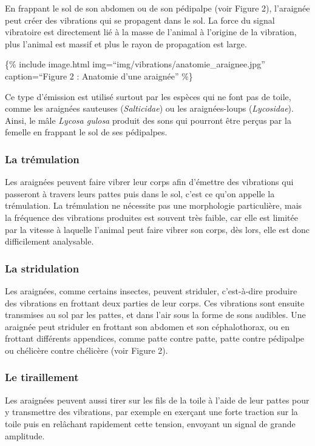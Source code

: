 En frappant le sol de son abdomen ou de son pédipalpe (voir Figure 2),
l'araignée peut créer des vibrations qui se propagent dans le sol. La
force du signal vibratoire est directement lié à la masse de l'animal à
l'origine de la vibration, plus l'animal est massif et plus le rayon de
propagation est large.

\{\% include image.html img=``img/vibrations/anatomie\_araignee.jpg''
caption=``Figure 2 : Anatomie d'une araignée'' \%\}

Ce type d'émission est utilisé surtout par les espèces qui ne font pas
de toile, comme les araignées sauteuses (\emph{Salticidae}) ou les
araignées-loups (\emph{Lycosidae}). Ainsi, le mâle \emph{Lycosa gulosa}
produit des sons qui pourront être perçus par la femelle en frappant le
sol de ses pédipalpes.

\subsubsection{La trémulation}\label{la-truxe9mulation}

Les araignées peuvent faire vibrer leur corps afin d'émettre des
vibrations qui passeront à travers leurs pattes puis dans le sol, c'est
ce qu'on appelle la trémulation. La trémulation ne nécessite pas une
morphologie particulière, mais la fréquence des vibrations produites est
souvent très faible, car elle est limitée par la vitesse à laquelle
l'animal peut faire vibrer son corps, dès lors, elle est donc
difficilement analysable.

\subsubsection{La stridulation}\label{la-stridulation}

Les araignées, comme certains insectes, peuvent striduler, c'est-à-dire
produire des vibrations en frottant deux parties de leur corps. Ces
vibrations sont ensuite transmises au sol par les pattes, et dans l'air
sous la forme de sons audibles. Une araignée peut striduler en frottant
son abdomen et son céphalothorax, ou en frottant différents appendices,
comme patte contre patte, patte contre pédipalpe ou chélicère contre
chélicère (voir Figure 2).

\subsubsection{Le tiraillement}\label{le-tiraillement}

Les araignées peuvent aussi tirer sur les fils de la toile à l'aide de
leur pattes pour y transmettre des vibrations, par exemple en exerçant
une forte traction sur la toile puis en relâchant rapidement cette
tension, envoyant un signal de grande amplitude.

